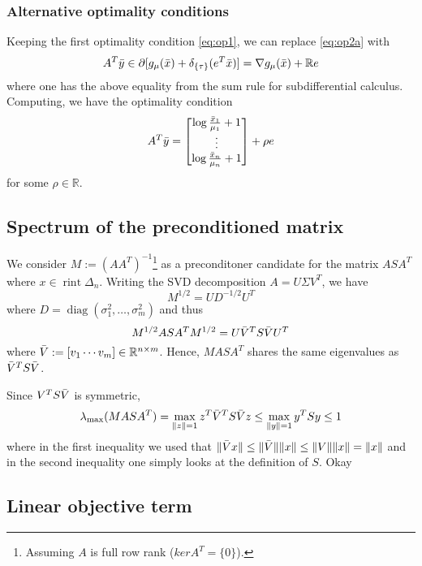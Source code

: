 \documentclass[10pt,a4paper]{article}
\numberwithin{equation}{section}
\theoremstyle{definition}
\def\rr{{\mathbb R}}
\DeclareMathOperator{\diag}{diag}
\DeclareMathOperator{\rint}{rint}
\begin{document}
\subsubsection{Alternative optimality conditions}

Keeping the first optimality condition \eqref{eq:op1}, we can replace \eqref{eq:op2a}  with 
\[
A^T\Bar{y} \in \partial [g_{\mu}(\Bar{x}) + \delta_{\{\tau\}}(e^T\Bar{x})] = \nabla g_{\mu}(\Bar{x}) + \rr e
\]
where one has the above equality from the sum rule for subdifferential calculus. Computing, we have the optimality condition 
\[
A^T\Bar{y} = \begin{bmatrix}
                \log \frac{\Bar{x}_1}{\mu_1} + 1 \\
                \vdots \\
                 \log \frac{\Bar{x}_n}{\mu_n} + 1
            \end{bmatrix} + \rho e
\]
for some $\rho \in \rr$.


\subsection{Spectrum of the preconditioned matrix}

We consider $M := (AA^T)^{-1}$\footnote{Assuming $A$ is full row rank ($ker A^T = \{0\}$).} as a preconditoner candidate for the matrix $ASA^T$ where $x \in \rint \Delta_n$. Writing the SVD decomposition $A = U \Sigma V^T$, we have
\[
M^{1/2} = U D^{-1/2}U^T 
\]
where $D = \diag(\sigma_1^2, \dots, \sigma_m^2)$ and thus 
\[
M^{1/2} ASA^T M^{1/2} = U\Bar{V}^T S \Bar{V}U^T
\]
where $\Bar{V} := [v_1 \cdots v_m] \in \rr^{n \times m}$. Hence, $MASA^T$ shares the same eigenvalues as $\Bar{V}^T S \Bar{V}$.

Since ${V}^T S \Bar{V}$ is symmetric,
\[
\lambda_{\max}(MASA^T) = \max_{\lVert z \rVert = 1}z^T \Bar{V}^T S \Bar{V} z \leq  \max_{\lVert y \rVert = 1}y^T S y \leq 1
\]
where in the first inequality we used that $\lVert \Bar{V} x \rVert \leq \lVert \Bar{V} \rVert \lVert x \rVert \leq \lVert V \rVert \lVert x \rVert = \lVert x \rVert$ and in the second inequality one simply looks at the definition of $S$.
Okay 
\subsection{Linear objective term}
\end{document}
